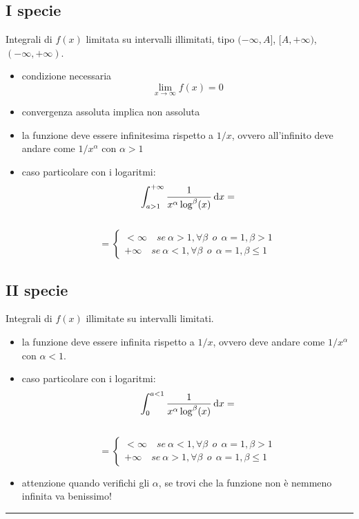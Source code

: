 \documentclass[a4paper,portrait,columns=3,5pt]{cheatsheet}
\begin{document}
\subsection{I specie}
Integrali di $f(x)$ limitata su intervalli illimitati, tipo $(- \infty, A]$, $[A, + \infty)$, $(-\infty, + \infty)$.
\begin{itemize}
    \item condizione necessaria $$\lim_ {x \rightarrow \infty} f(x) = 0$$
    \item convergenza assoluta implica non assoluta
    \item la funzione deve essere infinitesima rispetto a $1/x$, ovvero  all'infinito deve andare come $1/x^{\alpha}$ con $\alpha > 1$
    \item caso particolare con i logaritmi: $$ \int_{a>1}^{+ \infty} \frac{1}{x^\alpha \log^\beta (x)} \dif x  =$$ \\$$ = 
    \begin{cases*}
        < \infty \quad se~\alpha > 1, \forall \beta ~~ o ~~ \alpha = 1, \beta > 1 \\
        + \infty \quad se~\alpha < 1, \forall \beta ~~ o ~~ \alpha = 1, \beta \leq 1
    \end{cases*}$$
\end{itemize}
\subsection{II specie}
Integrali di $f(x)$ illimitate su intervalli limitati. 
\begin{itemize}
    \item la funzione deve essere infinita rispetto a $1/x$, ovvero deve andare come $1/x^{\alpha}$ con $\alpha < 1$.
    \item caso particolare con i logaritmi:
    $$ \int_0^{a<1} \frac{1}{x^\alpha \log^\beta (x)} \dif x  =$$ \\$$ = 
    \begin{cases*}
        < \infty \quad se~\alpha < 1, \forall \beta ~~ o ~~ \alpha = 1, \beta > 1 \\
        + \infty \quad se~\alpha > 1, \forall \beta ~~ o ~~ \alpha = 1, \beta \leq 1
    \end{cases*}$$
    \item attenzione quando verifichi gli $\alpha$, se trovi che la funzione non è nemmeno infinita va benissimo!
\end{itemize}
\hrule
\end{document}

